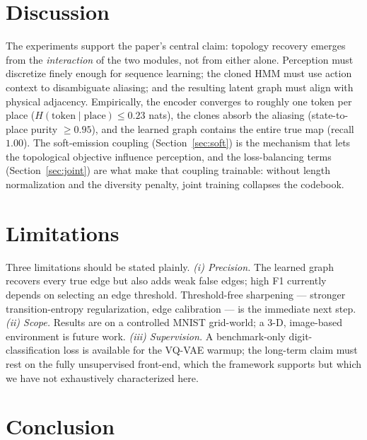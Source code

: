 \documentclass[twocolumn,10pt]{article}
\begin{document}
\section{Discussion}
\label{sec:discussion}

The experiments support the paper's central claim: topology recovery emerges
from the \emph{interaction} of the two modules, not from either alone.
Perception must discretize finely enough for sequence learning; the cloned HMM
must use action context to disambiguate aliasing; and the resulting latent
graph must align with physical adjacency. Empirically, the encoder converges
to roughly one token per place ($H(\text{token}\mid\text{place})\le0.23$
nats), the clones absorb the aliasing (state-to-place purity $\ge0.95$), and
the learned graph contains the entire true map (recall $1.00$). The
soft-emission coupling (Section~\ref{sec:soft}) is the mechanism that lets the
topological objective influence perception, and the loss-balancing terms
(Section~\ref{sec:joint}) are what make that coupling trainable: without length
normalization and the diversity penalty, joint training collapses the codebook.

\section{Limitations}
\label{sec:limitations}

Three limitations should be stated plainly. \emph{(i) Precision.} The learned
graph recovers every true edge but also adds weak false edges; high F1
currently depends on selecting an edge threshold. Threshold-free sharpening
--- stronger transition-entropy regularization, edge calibration --- is the
immediate next step. \emph{(ii) Scope.} Results are on a controlled MNIST
grid-world; a 3-D, image-based environment is future work. \emph{(iii)
Supervision.} A benchmark-only digit-classification loss is available for the
VQ-VAE warmup; the long-term claim must rest on the fully unsupervised
front-end, which the framework supports but which we have not exhaustively
characterized here.

\section{Conclusion}
\label{sec:conclusion}
\end{document}
